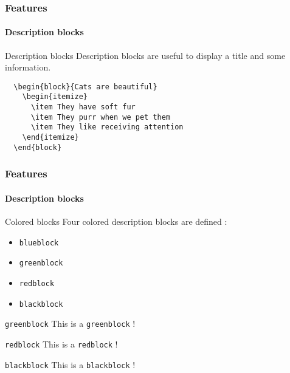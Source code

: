 \documentclass{beamer}
\begin{document}
\begin{frame}[c,fragile]
    \frametitle{Features}
    \framesubtitle{Description blocks}

    \begin{blueblock}{Description blocks}
        Description blocks are useful to display a title and some information.
    \end{blueblock}

    \begin{example}
        \scriptsize
        \begin{verbatim}
  \begin{block}{Cats are beautiful}
    \begin{itemize}
      \item They have soft fur
      \item They purr when we pet them
      \item They like receiving attention
    \end{itemize}
  \end{block}
        \end{verbatim}
    \end{example}
\end{frame}

\begin{frame}[c]
    \frametitle{Features}
    \framesubtitle{Description blocks}

    \begin{blueblock}{Colored blocks}
        Four colored description blocks are defined :
        \begin{multicols}{2}
        \begin{itemize}
            \item \texttt{blueblock}
            \item \texttt{greenblock}
            \item \texttt{redblock}
            \item \texttt{blackblock}
        \end{itemize}
        \end{multicols}
    \end{blueblock}

    \begin{greenblock}{\texttt{greenblock}}
        This is a \texttt{greenblock} !
    \end{greenblock}

    \begin{redblock}{\texttt{redblock}}
        This is a \texttt{redblock} !
    \end{redblock}

    \begin{blackblock}{\texttt{blackblock}}
        This is a \texttt{blackblock} !
    \end{blackblock}
\end{frame}
\end{document}
